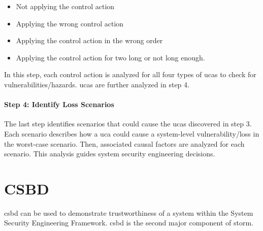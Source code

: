 \documentclass[../../main/main.tex]{subfiles}
\begin{document}
\begin{itemize}
\item Not applying the control action
\item Applying the wrong control action
\item Applying the control action in the wrong order
\item Applying the control action for two long or not long enough.
\end{itemize}

In this step, each control action is analyzed for all four types of \gls{uca}s to check for vulnerabilities/hazards.  \gls{uca}s are further analyzed in step 4.


\paragraph*{Step 4: Identify Loss Scenarios}
The last step identifies scenarios that could cause the \gls{uca}s discovered in step 3.  Each scenario describes how a \gls{uca} could cause a system-level vulnerability/loss in the worst-case scenario.  Then, associated causal factors are analyzed for each scenario.  This analysis guides system security engineering decisions.


%
%
%
\section{CSBD}\label{ssec:csbd}

\gls{csbd} can be used to demonstrate trustworthiness of a system within the System Security Engineering Framework.  \gls{csbd} is the second major component of \gls{storm}.
\end{document}
